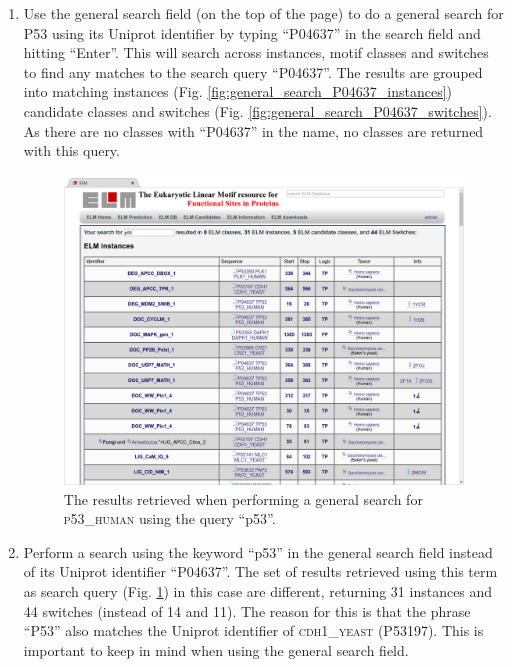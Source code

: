 \documentclass[12pt]{article}
\newcommand\uniprot[1]{%
	\textsc{\lowercase{#1}}%
}
\begin{document}
\begin{enumerate}
\item Use the general search field (on the top of the page) to do a general
	search for P53 using its Uniprot identifier by typing ``P04637'' in the
	search field and hitting ``Enter''. This will search
	across instances, motif classes and switches to find any matches to the
	search query ``P04637''. 
	The results are grouped into matching instances
	(Fig. \ref{fig:general_search_P04637_instances})
	candidate classes and switches
	(Fig. \ref{fig:general_search_P04637_switches}).
	As there are no classes with ``P04637'' in the name, no classes are
	returned with this query.


\begin{figure}[h!]
	\centering
	\includegraphics[width=\textwidth]{Figures/general_search/TP53_instances.png} 
	\caption{
		The results retrieved when performing a general search for
		\uniprot{P53\_Human} using the query ``p53''.
	}
	\label{fig:general_search_TP53_instances}
\end{figure}

\item Perform a search using the keyword ``p53'' in the general search field
	instead of its Uniprot identifier ``P04637''.
	The set of results retrieved using this term as search query
	(Fig. \ref{fig:general_search_TP53_instances})
	in this case are different, returning 31 instances and 44
	switches (instead of 14 and 11). The reason for this is that the
	phrase ``P53'' also matches the Uniprot identifier of
	\uniprot{CDH1\_YEAST} (P53197). This is important to keep in mind when
	using the general search field.

\end{enumerate}
\end{document}
